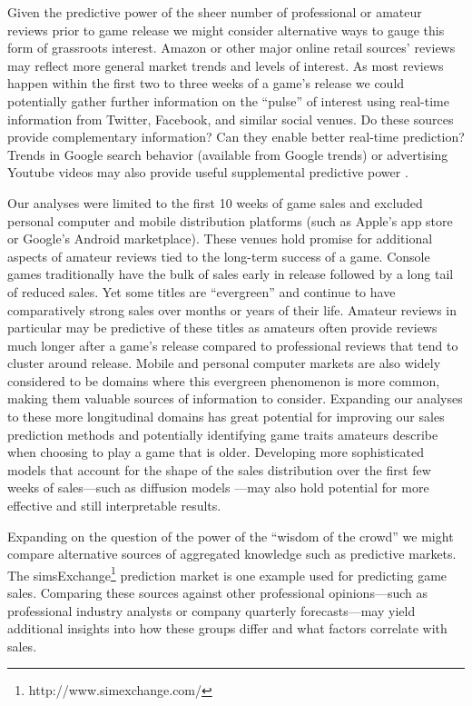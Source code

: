 \documentclass[letterpaper]{article}
\begin{document}
Given the predictive power of the sheer number of professional or amateur reviews prior to game release we might consider alternative ways to gauge this form of grassroots interest. Amazon or other major online retail sources' reviews may reflect more general market trends and levels of interest. As most reviews happen within the first two to three weeks of a game's release we could potentially gather further information on the ``pulse'' of interest using real-time information from Twitter, Facebook, and similar social venues. Do these sources provide complementary information? Can they enable better real-time prediction? Trends in Google search behavior (available from Google trends) or advertising Youtube videos may also provide useful supplemental predictive power \cite{asur2010predicting}.

Our analyses were limited to the first 10 weeks of game sales and excluded personal computer and mobile distribution platforms (such as Apple's app store or Google's Android marketplace). These venues hold promise for additional aspects of amateur reviews tied to the long-term success of a game. Console games traditionally have the bulk of sales early in release followed by a long tail of reduced sales. Yet some titles are ``evergreen'' and continue to have comparatively strong sales over months or years of their life. Amateur reviews in particular may be predictive of these titles as amateurs often provide reviews much longer after a game's release compared to professional reviews that tend to cluster around release. Mobile and personal computer markets are also widely considered to be domains where this evergreen phenomenon is more common, making them valuable sources of information to consider. Expanding our analyses to these more longitudinal domains has great potential for improving our sales prediction methods and potentially identifying game traits amateurs describe when choosing to play a game that is older. Developing more sophisticated models that account for the shape of the sales distribution over the first few weeks of sales---such as diffusion models \cite{dellarocas2007exploring}---may also hold potential for more effective and still interpretable results.

Expanding on the question of the power of the ``wisdom of the crowd'' we might compare alternative sources of aggregated knowledge such as predictive markets. The simsExchange\footnote{http://www.simexchange.com/} prediction market is one example used for predicting game sales. Comparing these sources against other professional opinions---such as professional industry analysts or company quarterly forecasts---may yield additional insights into how these groups differ and what factors correlate with sales.
\end{document}
